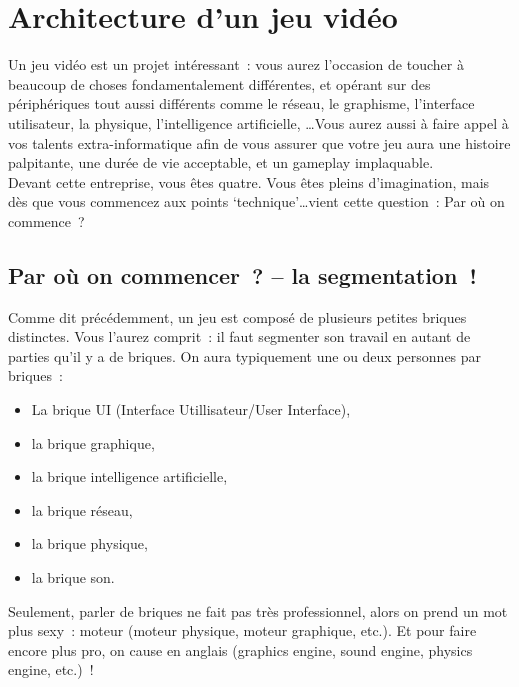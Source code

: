 \chapter{Architecture d'un jeu vidéo}

Un jeu vidéo est un projet intéressant~: vous aurez l’occasion de toucher à beaucoup de choses fondamentalement différentes, et opérant sur des périphériques tout aussi différents comme le réseau, le graphisme, l'interface utilisateur, la physique, l'intelligence artificielle, \ldots Vous aurez aussi à faire appel à vos talents extra-informatique afin de vous assurer que votre jeu aura une histoire palpitante, une durée de vie acceptable, et un gameplay implaquable.\\

Devant cette entreprise, vous êtes quatre. Vous êtes pleins d'imagination, mais dès que vous commencez aux points ‘technique’\ldots vient cette question~: \og Par où on commence~?\fg

\section[La segmentation]{Par où on commencer~? -- la segmentation~!}

Comme dit précédemment, un jeu est composé de plusieurs petites briques distinctes. Vous l'aurez comprit~: il faut segmenter son travail en autant de parties qu’il y a de briques. On aura typiquement une ou deux personnes par briques~:

\begin{itemize}
  \item La brique \og UI\fg{} (Interface Utillisateur/User Interface),
  \item la brique \og graphique\fg,
  \item la brique \og intelligence artificielle\fg,
  \item la brique \og réseau\fg,
  \item la brique \og physique\fg,
  \item la brique \og son\fg.
\end{itemize}

Seulement, parler de \og briques\fg{} ne fait pas très professionnel, alors on prend un mot plus sexy~: moteur (moteur physique, moteur graphique, etc.). Et pour faire encore plus pro, on cause en anglais (graphics engine, sound engine, physics engine, etc.)~!\\

